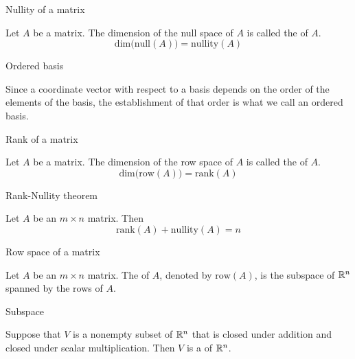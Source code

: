 \documentclass{ximera}
\begin{document}
Nullity of a matrix
\begin{expandable}
    Let $A$ be a matrix.  The dimension of the null space of $A$ is called the  of $A$.
$$\mbox{dim}\Big(\mbox{null}(A)\Big)=\mbox{nullity}(A)$$
\end{expandable}


Ordered basis
\begin{expandable}
    Since a coordinate vector with respect to a basis depends on the order of the elements of the basis, the establishment of that order is what we call an ordered basis.
\end{expandable}


Rank of a matrix
\begin{expandable}
    Let $A$ be a matrix.  The dimension of the row space of $A$ is called the  of $A$.
$$\mbox{dim}\Big(\mbox{row}(A)\Big)=\mbox{rank}(A)$$
\end{expandable}


Rank-Nullity theorem
\begin{expandable}
    Let $A$ be an $m\times n$ matrix.  Then 
$$\mbox{rank}(A)+\mbox{nullity}(A)=n$$
\end{expandable}


Row space of a matrix
\begin{expandable}
    Let $A$ be an $m\times n$ matrix.  The  of $A$, denoted by $\mbox{row}(A)$, is the subspace of $\mathbb{R}^n$ spanned by the rows of $A$.
\end{expandable}


Subspace
\begin{expandable}
    Suppose that $V$ is a nonempty subset of $\mathbb{R}^n$ that is closed under addition and closed under scalar multiplication.  Then $V$ is a  of $\mathbb{R}^n$.
\end{expandable}
\end{document}
